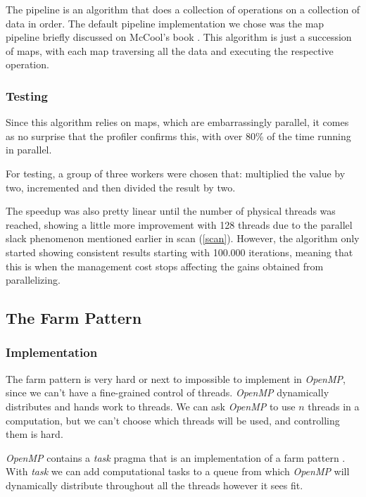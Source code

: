 \documentclass[9pt,journal]{IEEEtran}
\begin{document}
The pipeline is an algorithm that does a collection of operations on a collection of data in order. The default pipeline implementation we chose was the map pipeline briefly discussed on McCool's book \cite{mccool}. This algorithm is just a succession of maps, with each map traversing all the data and executing the respective operation.

\subsubsection{Testing}

Since this algorithm relies on maps, which are embarrassingly parallel, it comes as no surprise that the profiler confirms this, with over 80\% of the time running in parallel.

For testing, a group of three workers were chosen that: multiplied the value by two, incremented and then divided the result by two.

The speedup was also pretty linear until the number of physical threads was reached, showing a little more improvement with 128 threads due to the parallel slack phenomenon mentioned earlier in scan (\ref{scan}). However, the algorithm only started showing consistent results starting with 100.000 iterations, meaning that this is when the management cost stops affecting the gains obtained from parallelizing.

\subsection{The Farm Pattern}
\subsubsection{Implementation}

The farm pattern is very hard or next to impossible to implement in \textit{OpenMP}, since we can't have a fine-grained control of threads. \textit{OpenMP} dynamically distributes and hands work to threads. We can ask \textit{OpenMP} to use $ n $ threads in a computation, but we can't choose which threads will be used, and controlling them is hard.

\textit{OpenMP} contains a \textit{task} pragma that is an implementation of a farm pattern \cite{jlfarm}. With \textit{task} we can add computational tasks to a queue from which \textit{OpenMP} will dynamically distribute throughout all the threads however it sees fit.
\end{document}
